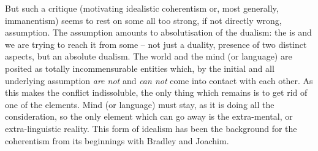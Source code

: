 But such a critique (motivating idealistic coherentism or, most generally,
immanentism) seems to rest on some all too strong, if not directly wrong,
assumption. The assumption amounts to absolutisation of the dualism: the
 is  and we are trying to reach it
from some  -- not just a duality, presence of two distinct
aspects, but an absolute dualism. The world and the mind
(or language) are posited as totally incommensurable entities which, by the
initial and all underlying assumption {\em are not} and {\em can not} come into
contact with each other. As this makes the conflict indissoluble, the only thing
which remains is to get rid of one of the elements. Mind (or language) must
stay, as it is doing all the consideration, so the only element which can go
away is the extra-mental, or extra-linguistic reality. This form of idealism has been
the background for the coherentism from its beginnings with Bradley and
Joachim.

